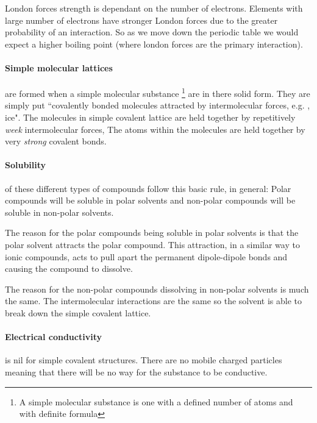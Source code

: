 	London forces strength is dependant on the number of electrons.
	Elements with large number of electrons have stronger London forces due to the greater probability of an interaction.
	So as we move down the periodic table we would expect a higher boiling point (where london forces are the primary interaction).
	
	\paragraph{Simple molecular lattices} are formed when a simple molecular substance
	\footnote{A simple molecular substance is one with a defined number of atoms and with definite formula} are in there solid form.
	They are simply put ``covalently bonded molecules attracted by intermolecular forces, e.g. , ice".
	The molecules in simple covalent lattice are held together by repetitively \textit{week} intermolecular forces, The atoms within the molecules are held together by very \textit{strong} covalent bonds.
	
	\paragraph{Solubility} of these different types of compounds follow this basic rule, in general: Polar compounds will be soluble in polar solvents and non-polar compounds will be soluble in non-polar solvents.
	
	The reason for the polar compounds being soluble in polar solvents is that the polar solvent attracts the polar compound.
	This attraction, in a similar way to ionic compounds, acts to pull apart the permanent dipole-dipole bonds and causing the compound to dissolve.
	
	The reason for the non-polar compounds dissolving in non-polar solvents is much the same.
	The intermolecular interactions are the same so the solvent is able to break down the simple covalent lattice.
	
	\paragraph{Electrical conductivity} is nil for simple covalent structures.
	There are no mobile charged particles meaning that there will be no way for the substance to be conductive.